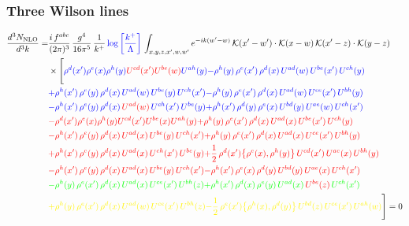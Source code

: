 \documentclass[9pt]{article}
\numberwithin{equation}{section}
\begin{document}
\subsubsection{Three Wilson lines}
\begin{align}
    \frac{d^{3}N_{\rm NLO}}{d^{3}k}= & \frac{i\,f^{abc}}{(2\pi)^{3}}\,\frac{g^{4}}{16\pi^{5}}\,\frac{1}{k^{+}}\,{\color{blue}\log{\left[\frac{k^{+}}{\Lambda}\right]}}\,\int_{x,y,z,x',w,w'}e^{-ik(w'-w)}\,\mathcal{K}(x'-w')\cdot\mathcal{K}(x-w)\,\mathcal{K}(x'-z)\cdot\mathcal{K}(y-z)\notag \\ & \times\Bigg[{\color{blue}\rho^{d}(x') \rho^{e}(x) \rho^{h}(y) {\color{red}U^{cd}(x')} {\color{red}U^{be}(w)} U^{a h}(y)}{\color{blue}-\rho^{h}(y)\,\rho^{e}(x')\,\rho^{d}(x)\,U^{ad}(w)\,U^{be}(x')\,U^{ch}(y)}\notag \\
&{\color{blue}+\rho^{h}(x')\,\rho^{e}(y)\,\rho^{d}(x)\,U^{ad}(w)\,U^{be}(y)\,U^{ch}(x')}{\color{blue}-\rho^{h}(y)\,\rho^{e}(x')\,\rho^{d}(x)\,U^{ad}(w)\,U^{ce}(x')\,U^{bh}(y)} \notag \\ &{\color{blue}-\rho^{h}(x')\,\rho^{e}(y)\,\rho^{d}(x)\,{\color{red}U^{ad}(w)}\,U^{ch}(x')\,U^{be}(y)}{\color{blue}+\rho^{h}(x')\,\rho^{d}(y)\,\rho^{e}(x)\,U^{bd}(y)\,U^{ae}(w)\,U^{ch}(x')}\notag \\
&{\color{red}-\rho^{d}(x') \rho^{e}(x) \rho^{h}(y) {\color{red}U^{cd}(x')} U^{b e}(x) U^{a h}(y)}{\color{red}+\rho^{h}(y)\,\rho^{e}(x')\,\rho^{d}(x)\,U^{ad}(x)\,U^{be}(x')\,U^{ch}(y)}\notag \\ & {\color{red}-\rho^{h}(x')\,\rho^{e}(y)\,\rho^{d}(x)\,U^{ad}(x)\,U^{be}(y)\,U^{ch}(x')} {\color{red}+\rho^{h}(y)\,\rho^{e}(x')\,\rho^{d}(x)\,U^{ad}(x)\,U^{ce}(x')\,U^{bh}(y)}\notag \\ & {\color{red}+\rho^{h}(x')\,\rho^{e}(y)\,\rho^{d}(x)\,{\color{red}U^{ad}(x)}\,U^{ch}(x')\,U^{be}(y)}{\color{red}+\frac{1}{2}\,\rho^{d}(x')\big\{\rho^{e}(x),\rho^{h}(y)\big\}\,U^{cd}(x')\,U^{ae}(x)\,U^{bh}(y)}\notag \\ & {\color{red}-\rho^{h}(x')\,\rho^{e}(y)\,\rho^{d}(x)\,U^{ad}(x)\,U^{be}(y)\,U^{ch}(x')}{\color{red}-\rho^{h}(x')\,\rho^{e}(x)\,\rho^{d}(y)\,U^{bd}(y)\,U^{ae}(x)\,U^{ch}(x')}\notag \\ & {\color{green}-\rho^{h}(y)\,\rho^{e}(x')\,\rho^{d}(x)\,U^{ad}(x)\,U^{ce}(x')\,U^{bh}(z)}{\color{green}+\rho^{h}(x')\,\rho^{d}(x)\,\rho^{e}(y)\,U^{ad}(x)\,{\color{red}U^{be}(z)}\,U^{ch}(x')}\notag \\ & {\color{yellow}+\rho^{h}(y)\,\rho^{e}(x')\,\rho^{d}(x)\,U^{ad}(w)\,U^{ce}(x')\,U^{bh}(z)}{\color{yellow}-\frac{1}{2}\,\rho^{e}(x')\big\{\rho^{h}(x),\rho^{d}(y)\big\}\,U^{bd}(z)\,U^{ce}(x')\,U^{ah}(w)}\Bigg] = 0
\end{align}
\end{document}

